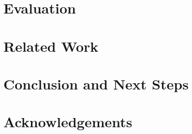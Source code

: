 \documentclass{sig-alternate}
\begin{document}
\section{Evaluation}
\label{sect:evaluation}

\section{Related Work}

\section{Conclusion and Next Steps}

\section*{Acknowledgements}



\end{document}

